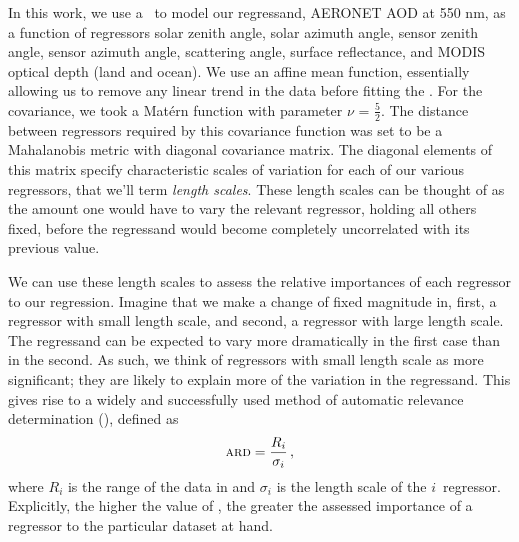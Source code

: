 \documentclass[journal]{IEEEtran}
\begin{document}
In this work, we use a \gp\ to model our regressand, AERONET AOD at 550 nm, as a function of regressors solar zenith angle, solar azimuth angle,  sensor zenith angle, sensor azimuth angle,  scattering angle, surface reflectance, and MODIS optical depth (land and ocean). We use an affine mean function, essentially allowing us to remove any linear trend in the data before fitting the \gp. For the covariance, we took a Mat\'{e}rn function with parameter $\nu$ = $\frac{5}{2}$. The distance between regressors required by this covariance function was set to be a Mahalanobis metric with diagonal covariance matrix. The diagonal elements of this matrix specify characteristic scales of variation for each of our various regressors, that we'll term \emph{length scales}. These length scales can be thought of as the amount one would have to vary the relevant regressor, holding all others fixed, before the regressand would become completely uncorrelated with its previous value.  

We can use these length scales to assess the relative importances of each regressor to our regression. Imagine that we make a change of fixed magnitude in, first, a regressor with small length scale, and second, a regressor with large length scale. The regressand can be expected to vary more dramatically in the first case than in the second. As such, we think of regressors with small length scale as more significant; they are likely to explain more of the variation in the regressand. This gives rise to a widely and successfully used \cite{GPsBook} method of automatic relevance determination (\ARD), defined as 
$$\text{{{\scshape ard}}} = \frac{R_i}{\sigma_i}\,,$$
where $R_i$ is the range of the data in and $\sigma_i$ is the length scale of the $i$\thth\ regressor. Explicitly, the higher the value of \ARD, the greater the assessed  importance of a regressor to the particular dataset at hand.
\end{document}
